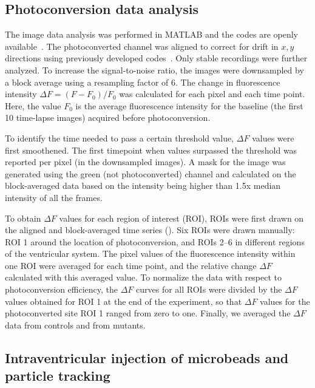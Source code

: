 \documentclass{WileyMSP-template}
\begin{document}
\subsection{Photoconversion data analysis}
The image data analysis was performed in MATLAB and the codes are
openly available~.  The
photoconverted channel was aligned to correct for drift in $x,y$
directions using previously developed
codes~\cite{Reiten2017Motile-Cilia-MediatedComputations,
  Ringers2023NovelEpithelia}.  Only stable recordings were further
analyzed.  To increase the signal-to-noise ratio, the images were
downsampled by a block average using a resampling factor of 6. %
The change in fluorescence intensity
$\Delta F = (F-F_0)/F_0$ was
calculated for each pixel and each time point.  Here, the
value $F_0$ is the average fluorescence intensity for the baseline
(the first 10 time-lapse images) acquired before photoconversion.

To identify the time needed to pass a certain threshold value,
$\Delta F$ values were first smoothened.
The first timepoint when values surpassed the threshold was reported
per pixel (in the downsampled images).
A mask for the image was generated using the green (not photoconverted)
channel and calculated on the block-averaged data based on the intensity
being higher than 1.5x median intensity of all the frames.

To obtain $\Delta F$ values for each region of interest (ROI), ROIs were
first drawn on the aligned and block-averaged time series ().
Six ROIs were drawn manually: ROI 1 around the location of photoconversion,
and ROIs 2--6 in different regions of the ventricular system.
The pixel values of the fluorescence intensity within one ROI were
averaged for each time point, and the relative change $\Delta F$ calculated with this averaged value.
To normalize the data with respect to photoconversion efficiency, the
$\Delta F$ curves for all ROIs were divided by the $\Delta F$ values
obtained for ROI 1 at the end of the experiment,
so that $\Delta F$ values for the photoconverted site ROI 1 ranged from
zero to one. Finally, we averaged the $\Delta F$ data from controls and from mutants.

\subsection{Intraventricular injection of microbeads and particle tracking}
\end{document}
